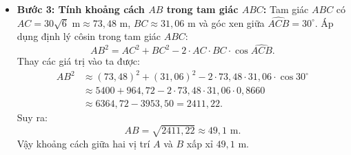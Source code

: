 \documentclass[12pt,a4paper]{article}
\begin{document}
\begin{enumerate}[leftmargin=0.6cm, itemsep=6pt]
\begin{itemize}
        \item \textbf{Bước 3: Tính khoảng cách $AB$ trong tam giác $ABC$:}
        Tam giác $ABC$ có $AC = 30\sqrt{6}\text{ m} \approx 73,48\text{ m}$, $BC \approx 31,06\text{ m}$ và góc xen giữa $\widehat{ACB} = 30^\circ$.
        Áp dụng định lý côsin trong tam giác $ABC$:
        \[AB^2 = AC^2 + BC^2 - 2 \cdot AC \cdot BC \cdot \cos \widehat{ACB}.\]
        Thay các giá trị vào ta được:
        \begin{align*}
            AB^2 &\approx (73,48)^2 + (31,06)^2 - 2 \cdot 73,48 \cdot 31,06 \cdot \cos 30^\circ \\
            &\approx 5400 + 964,72 - 2 \cdot 73,48 \cdot 31,06 \cdot 0,8660 \\
            &\approx 6364,72 - 3953,50 = 2411,22.
        \end{align*}
        Suy ra:
        \[AB = \sqrt{2411,22} \approx 49,1\text{ m}.\]
        Vậy khoảng cách giữa hai vị trí $A$ và $B$ xấp xỉ $49,1\text{ m}$.
    \end{itemize}
\end{enumerate}
\end{document}
